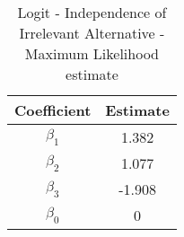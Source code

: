 \begin{table}[h!]
\centering
\caption{Logit - Independence of Irrelevant Alternative - Maximum Likelihood estimate}\label{tab:mvIIA}
\begin{tabular}{cc}
 \hline 
Coefficient & Estimate \\ \hline 
$\beta_1$ & 1.382 \\ 
$\beta_2$ & 1.077 \\ 
$\beta_3$ & -1.908 \\ 
$\beta_0$ & 0 \\ 
\hline
\end{tabular}
\end{table}

